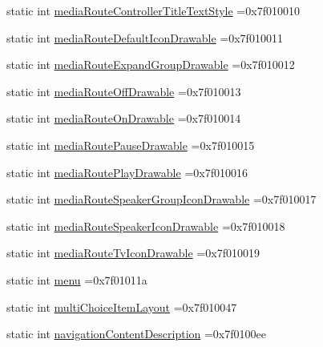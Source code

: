 \begin{DoxyCompactItemize}
\item 
static int \hyperlink{classandroid_1_1support_1_1v7_1_1recyclerview_1_1R_1_1attr_a8277231968e140661c49cea25963e5da}{media\+Route\+Controller\+Title\+Text\+Style} =0x7f010010
\item 
static int \hyperlink{classandroid_1_1support_1_1v7_1_1recyclerview_1_1R_1_1attr_a1bb47e107417606d7a798a3dbc4be71a}{media\+Route\+Default\+Icon\+Drawable} =0x7f010011
\item 
static int \hyperlink{classandroid_1_1support_1_1v7_1_1recyclerview_1_1R_1_1attr_a02776330404d711cd17a612f4f21cef1}{media\+Route\+Expand\+Group\+Drawable} =0x7f010012
\item 
static int \hyperlink{classandroid_1_1support_1_1v7_1_1recyclerview_1_1R_1_1attr_a4e6fb433ab766fc1f17e97b471100cc9}{media\+Route\+Off\+Drawable} =0x7f010013
\item 
static int \hyperlink{classandroid_1_1support_1_1v7_1_1recyclerview_1_1R_1_1attr_a841db7150a4c491f85f4d55844e623c8}{media\+Route\+On\+Drawable} =0x7f010014
\item 
static int \hyperlink{classandroid_1_1support_1_1v7_1_1recyclerview_1_1R_1_1attr_a8e472a6e3d545d9d2c008a2c359fc530}{media\+Route\+Pause\+Drawable} =0x7f010015
\item 
static int \hyperlink{classandroid_1_1support_1_1v7_1_1recyclerview_1_1R_1_1attr_a01df66b1b743f09fb764ac3156033696}{media\+Route\+Play\+Drawable} =0x7f010016
\item 
static int \hyperlink{classandroid_1_1support_1_1v7_1_1recyclerview_1_1R_1_1attr_ae71e171d73d64f13a04d0dc52499330a}{media\+Route\+Speaker\+Group\+Icon\+Drawable} =0x7f010017
\item 
static int \hyperlink{classandroid_1_1support_1_1v7_1_1recyclerview_1_1R_1_1attr_a251fbbab5f83eb72223a6579866b5b18}{media\+Route\+Speaker\+Icon\+Drawable} =0x7f010018
\item 
static int \hyperlink{classandroid_1_1support_1_1v7_1_1recyclerview_1_1R_1_1attr_a5572dca1e481e5976cd727ded44ce90d}{media\+Route\+Tv\+Icon\+Drawable} =0x7f010019
\item 
static int \hyperlink{classandroid_1_1support_1_1v7_1_1recyclerview_1_1R_1_1attr_a59ac456be2890b4872752efb7d1abb4d}{menu} =0x7f01011a
\item 
static int \hyperlink{classandroid_1_1support_1_1v7_1_1recyclerview_1_1R_1_1attr_a5d1d6a0af631a58d219950dac54d0681}{multi\+Choice\+Item\+Layout} =0x7f010047
\item 
static int \hyperlink{classandroid_1_1support_1_1v7_1_1recyclerview_1_1R_1_1attr_ab2a840fba59a364635c0dbd1de4bcd0d}{navigation\+Content\+Description} =0x7f0100ee

\end{DoxyCompactItemize}
